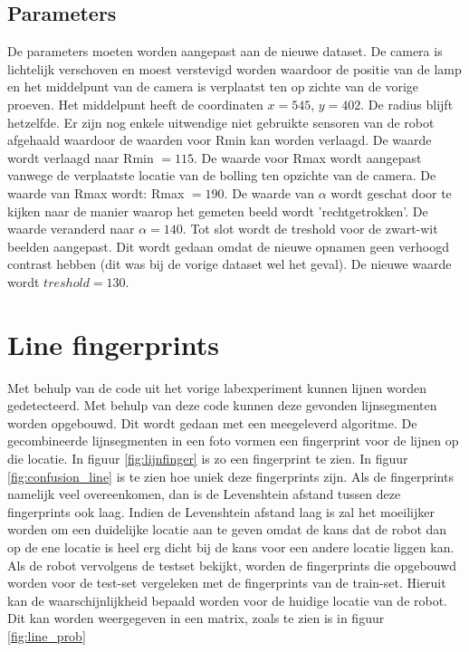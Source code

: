 \documentclass[a4paper]{article}
\begin{document}
\subsection{Parameters}
De parameters moeten worden aangepast aan de nieuwe dataset. De camera is lichtelijk verschoven en moest verstevigd worden waardoor de positie van de lamp en het middelpunt van de camera is verplaatst ten op zichte van de vorige proeven. Het middelpunt heeft de coordinaten $x = 545$, $y = 402$. De radius blijft hetzelfde. Er zijn nog enkele uitwendige niet gebruikte sensoren van de robot afgehaald waardoor de waarden voor Rmin kan worden verlaagd. De waarde wordt verlaagd naar Rmin $= 115$. De waarde voor Rmax wordt aangepast vanwege de verplaatste locatie van de bolling ten opzichte van de camera. De waarde van Rmax wordt: Rmax $= 190$. De waarde van $\alpha$ wordt geschat door te kijken naar de manier waarop het gemeten beeld wordt 'rechtgetrokken'. De waarde veranderd naar $\alpha = 140$. Tot slot wordt de treshold voor de zwart-wit beelden aangepast. Dit wordt gedaan omdat de nieuwe opnamen geen verhoogd contrast hebben (dit was bij de vorige dataset wel het geval). De nieuwe waarde wordt  $treshold = 130$.


\section{Line fingerprints}
Met behulp van de code uit het vorige labexperiment kunnen lijnen worden gedetecteerd. Met behulp van deze code kunnen deze gevonden lijnsegmenten worden opgebouwd. Dit wordt gedaan met een meegeleverd algoritme. De gecombineerde lijnsegmenten in een foto vormen een fingerprint voor de lijnen op die locatie. In figuur \ref{fig:lijnfinger} is zo een fingerprint te zien. 
In figuur \ref{fig:confusion_line} is te zien hoe uniek deze fingerprints zijn. Als de fingerprints namelijk veel overeenkomen, dan is de Levenshtein afstand tussen deze fingerprints ook laag. Indien de Levenshtein afstand laag is zal het moeilijker worden om een duidelijke locatie aan te geven omdat de kans dat de robot dan op de ene locatie is heel erg dicht bij de kans voor een andere locatie liggen kan. 
Als de robot vervolgens de testset bekijkt, worden de fingerprints die opgebouwd worden voor de test-set vergeleken met de fingerprints van de train-set. Hieruit kan de waarschijnlijkheid bepaald worden voor de huidige locatie van de robot. Dit kan worden weergegeven in een matrix, zoals te zien is in figuur \ref{fig:line_prob}
\end{document}
